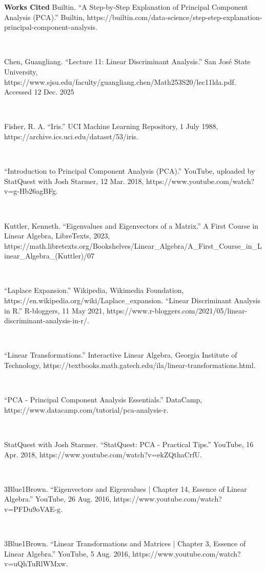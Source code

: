 \documentclass{article}
\begin{document}
\newpage
\centering
\textbf{Works Cited}
\flushleft
Builtin. “A Step-by-Step Explanation of Principal Component Analysis (PCA).” Builtin, https://builtin.com/data-science/step-step-explanation-principal-component-analysis. 

\

Chen, Guangliang. “Lecture 11: Linear Discriminant Analysis.” San José State University, 
https://www.sjsu.edu/faculty/guangliang.chen/Math253S20/lec11lda.pdf. Accessed 12 Dec. 2025

\

Fisher, R. A. “Iris.” UCI Machine Learning Repository, 1 July 1988, https://archive.ics.uci.edu/dataset/53/iris. 

\

“Introduction to Principal Component Analysis (PCA).” YouTube, uploaded by StatQuest with Josh Starmer, 12 Mar. 2018, https://www.youtube.com/watch?v=g-Hb26agBFg.

\

Kuttler, Kenneth. “Eigenvalues and Eigenvectors of a Matrix.” A First Course in Linear Algebra, LibreTexts, 2023, https://math.libretexts.org/Bookshelves/Linear_Algebra/A_First_Course_in_Linear_Algebra_(Kuttler)/07%

\

“Laplace Expansion.” Wikipedia, Wikimedia Foundation, https://en.wikipedia.org/wiki/Laplace_expansion. 
“Linear Discriminant Analysis in R.” R-bloggers, 11 May 2021, https://www.r-bloggers.com/2021/05/linear-discriminant-analysis-in-r/. 

\

“Linear Transformations.” Interactive Linear Algebra, Georgia Institute of Technology, https://textbooks.math.gatech.edu/ila/linear-transformations.html. 

\

“PCA - Principal Component Analysis Essentials.” DataCamp, https://www.datacamp.com/tutorial/pca-analysis-r. 

\

StatQuest with Josh Starmer. “StatQuest: PCA - Practical Tips.” YouTube, 16 Apr. 2018, https://www.youtube.com/watch?v=ekZQthaCrfU.

\

3Blue1Brown. “Eigenvectors and Eigenvalues | Chapter 14, Essence of Linear Algebra.” YouTube, 26 Aug. 2016, https://www.youtube.com/watch?v=PFDu9oVAE-g.

\

3Blue1Brown. “Linear Transformations and Matrices | Chapter 3, Essence of Linear Algebra.” YouTube, 5 Aug. 2016, https://www.youtube.com/watch?v=uQhTuRlWMxw.
\end{document}

